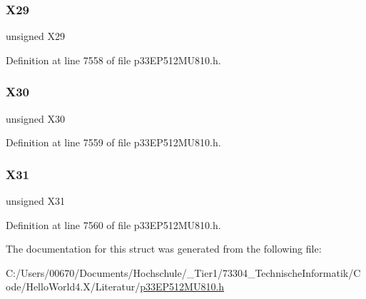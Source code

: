\subsubsection{\texorpdfstring{X29}{X29}}
{\footnotesize\ttfamily unsigned X29}



Definition at line 7558 of file p33\+E\+P512\+M\+U810.\+h.

\mbox{\label{structtag_c_r_c_x_o_r_h_b_i_t_s_a74cf3409511eae45282fd11004523974}} 
\subsubsection{\texorpdfstring{X30}{X30}}
{\footnotesize\ttfamily unsigned X30}



Definition at line 7559 of file p33\+E\+P512\+M\+U810.\+h.

\mbox{\label{structtag_c_r_c_x_o_r_h_b_i_t_s_ab1dedfa9b394f7fa0afee647b393effe}} 
\subsubsection{\texorpdfstring{X31}{X31}}
{\footnotesize\ttfamily unsigned X31}



Definition at line 7560 of file p33\+E\+P512\+M\+U810.\+h.



The documentation for this struct was generated from the following file\+:\begin{DoxyCompactItemize}
\item 
C\+:/\+Users/00670/\+Documents/\+Hochschule/\+\_\+\+Tier1/73304\+\_\+\+Technische\+Informatik/\+Code/\+Hello\+World4.\+X/\+Literatur/\hyperlink{p33_e_p512_m_u810_8h}{p33\+E\+P512\+M\+U810.\+h}\end{DoxyCompactItemize}
